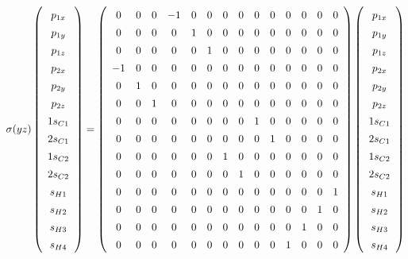 \documentclass[9pt]{report}
\begin{document}
\scriptsize
\begin{equation}
\sigma(yz)
\renewcommand{\arraystretch}{1.4}
\left(\begin{array}{c} p_{1x}  \\  p_{1y}  \\  p_{1z}  \\  p_{2x}  \\ p_{2y} \\  p_{2z}  \\  1s_{C1}  \\  2s_{C1}  \\  1s_{C2}  \\  2s_{C2}  \\  s_{H1}  \\  s_{H2}  \\  s_{H3}  \\  s_{H4}   \\\end{array}\right)
=
\left(\begin{array}{cccccccccccccc}
0 & 0 & 0 & -1 & 0 & 0 & 0 & 0 & 0 & 0 & 0 & 0 & 0 & 0
\\
0 & 0 & 0 & 0 & 1 & 0 & 0 & 0 & 0 & 0 & 0 & 0 & 0 & 0
\\
0 & 0 & 0 & 0 & 0 & 1 & 0 & 0 & 0 & 0 & 0 & 0 & 0 & 0
\\
-1 & 0 & 0 & 0 & 0 & 0 & 0 & 0 & 0 & 0 & 0 & 0 & 0 & 0
\\
0 & 1 & 0 & 0 & 0 & 0 & 0 & 0 & 0 & 0 & 0 & 0 & 0 & 0
\\
0 & 0 & 1 & 0 & 0 & 0 & 0 & 0 & 0 & 0 & 0 & 0 & 0 & 0
\\
0 & 0 & 0 & 0 & 0 & 0 & 0 & 0 & 1 & 0 & 0 & 0 & 0 & 0
\\
0 & 0 & 0 & 0 & 0 & 0 & 0 & 0 & 0 & 1 & 0 & 0 & 0 & 0
\\
0 & 0 & 0 & 0 & 0 & 0 & 1 & 0 & 0 & 0 & 0 & 0 & 0 & 0
\\
0 & 0 & 0 & 0 & 0 & 0 & 0 & 1 & 0 & 0 & 0 & 0 & 0 & 0
\\
0 & 0 & 0 & 0 & 0 & 0 & 0 & 0 & 0 & 0 & 0 & 0 & 0 & 1
\\
0 & 0 & 0 & 0 & 0 & 0 & 0 & 0 & 0 & 0 & 0 & 0 & 1 & 0
\\
0 & 0 & 0 & 0 & 0 & 0 & 0 & 0 & 0 & 0 & 0 & 1 & 0 & 0
\\
0 & 0 & 0 & 0 & 0 & 0 & 0 & 0 & 0 & 0 & 1 & 0 & 0 & 0
\\\end{array}\right)
\left(\begin{array}{c} p_{1x}  \\  p_{1y}  \\  p_{1z}  \\  p_{2x}  \\ p_{2y} \\  p_{2z}  \\  1s_{C1}  \\  2s_{C1}  \\  1s_{C2}  \\  2s_{C2}  \\  s_{H1}  \\  s_{H2}  \\  s_{H3}  \\  s_{H4}   \\\end{array}\right)
\end{equation}
\end{document}
